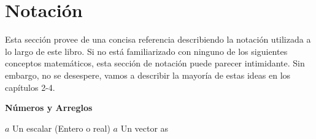 \chapter{Notación}
\label{chp:notacion}
Esta sección provee de una concisa referencia describiendo la notación utilizada a lo largo de este libro. Si no está familiarizado con ninguno de los siguientes conceptos matemáticos, esta sección de notación puede parecer intimidante. Sin embargo, no se desespere, vamos a describir la mayoría de estas ideas en los capítulos 2-4.
\vspace{5pt}
\begin{center}
    \textbf{\large Números y Arreglos}
\end{center}
\hspace{50pt} $a$ \hspace{30pt} Un escalar (Entero o real) \newline
\hspace{50pt} \textbf{$a$} \hspace{30pt} Un vector \newline
\hspace{50pt} as




































































































